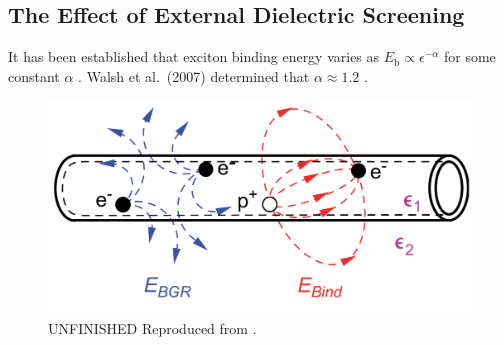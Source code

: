 
\subsection{The Effect of External Dielectric Screening}

It has been established that exciton binding energy varies as $E_\text{b} \propto \epsilon^{-\alpha}$ for some constant $\alpha$ \cite{perebeinos2004scaling}. Walsh et al.\ (2007) determined that $\alpha \approx 1.2$ \cite{walsh2008scaling}.

\begin{figure}
	\centering
	\includegraphics[scale=0.23]{images/chapter_optical_props/dielectric_screening_walsh_2007}
	\caption{{\color{red} UNFINISHED} Reproduced from \cite{walsh2008scaling}.}
\end{figure}

